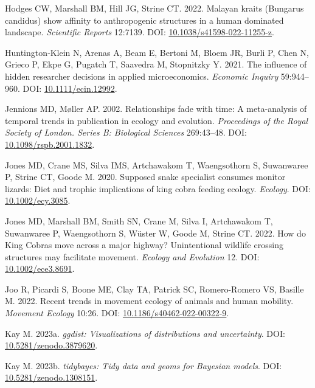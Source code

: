\documentclass[10pt,a4paper]{article}
\newlength{\cslhangindent}
\newenvironment{CSLReferences}[2] %
 {\begin{list}{}{%
  \setlength{\itemindent}{0pt}
  \setlength{\leftmargin}{0pt}
  \setlength{\parsep}{0pt}
  \ifodd #1
   \setlength{\leftmargin}{\cslhangindent}
   \setlength{\itemindent}{-1\cslhangindent}
  \fi
  \setlength{\itemsep}{#2\baselineskip}}}
 {\end{list}}
\begin{document}
\begin{CSLReferences}{1}{0}
Hodges CW, Marshall BM, Hill JG, Strine CT. 2022. Malayan kraits ({Bungarus} candidus) show affinity to anthropogenic structures in a human dominated landscape. \emph{Scientific Reports} 12:7139. DOI: \href{https://doi.org/10.1038/s41598-022-11255-z}{10.1038/s41598-022-11255-z}.

Huntington‐Klein N, Arenas A, Beam E, Bertoni M, Bloem JR, Burli P, Chen N, Grieco P, Ekpe G, Pugatch T, Saavedra M, Stopnitzky Y. 2021. The influence of hidden researcher decisions in applied microeconomics. \emph{Economic Inquiry} 59:944--960. DOI: \href{https://doi.org/10.1111/ecin.12992}{10.1111/ecin.12992}.

Jennions MD, Møller AP. 2002. Relationships fade with time: A meta-analysis of temporal trends in publication in ecology and evolution. \emph{Proceedings of the Royal Society of London. Series B: Biological Sciences} 269:43--48. DOI: \href{https://doi.org/10.1098/rspb.2001.1832}{10.1098/rspb.2001.1832}.

Jones MD, Crane MS, Silva IMS, Artchawakom T, Waengsothorn S, Suwanwaree P, Strine CT, Goode M. 2020. Supposed snake specialist consumes monitor lizards: Diet and trophic implications of king cobra feeding ecology. \emph{Ecology}. DOI: \href{https://doi.org/10.1002/ecy.3085}{10.1002/ecy.3085}.

Jones MD, Marshall BM, Smith SN, Crane M, Silva I, Artchawakom T, Suwanwaree P, Waengsothorn S, Wüster W, Goode M, Strine CT. 2022. How do {King} {Cobras} move across a major highway? {Unintentional} wildlife crossing structures may facilitate movement. \emph{Ecology and Evolution} 12. DOI: \href{https://doi.org/10.1002/ece3.8691}{10.1002/ece3.8691}.

Joo R, Picardi S, Boone ME, Clay TA, Patrick SC, Romero-Romero VS, Basille M. 2022. Recent trends in movement ecology of animals and human mobility. \emph{Movement Ecology} 10:26. DOI: \href{https://doi.org/10.1186/s40462-022-00322-9}{10.1186/s40462-022-00322-9}.

Kay M. 2023a. \emph{{ggdist}: Visualizations of distributions and uncertainty}. DOI: \href{https://doi.org/10.5281/zenodo.3879620}{10.5281/zenodo.3879620}.

Kay M. 2023b. \emph{{tidybayes}: Tidy data and geoms for {Bayesian} models}. DOI: \href{https://doi.org/10.5281/zenodo.1308151}{10.5281/zenodo.1308151}.


\end{CSLReferences}
\end{document}
